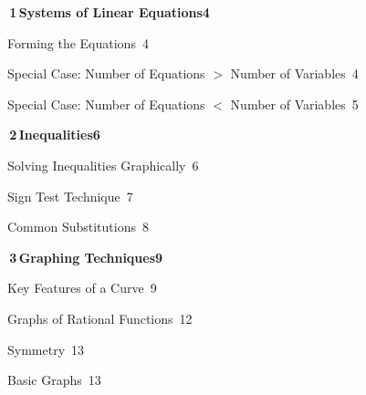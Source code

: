 \documentclass[a4paper,openany]{book}
\begin{document}
{\small\linespread{0.92}\selectfont
\medskip\noindent\colorbox{blue!8}{\parbox{\dimexpr\textwidth-2\fboxsep}{\large\bfseries\color{blue!50!black}\colorbox{blue!50!black}{\color{white}\,1\,}\quad Systems of Linear Equations\hfill 4}}\par\nopagebreak\smallskip\nopagebreak
\noindent{}\quad Forming the Equations\dotfill\ 4\par
\noindent{}\quad Special Case: Number of Equations $>$ Number of Variables\dotfill\ 4\par
\noindent{}\quad Special Case: Number of Equations $<$ Number of Variables\dotfill\ 5\par
\medskip\noindent\colorbox{blue!8}{\parbox{\dimexpr\textwidth-2\fboxsep}{\large\bfseries\color{blue!50!black}\colorbox{blue!50!black}{\color{white}\,2\,}\quad Inequalities\hfill 6}}\par\nopagebreak\smallskip\nopagebreak
\noindent{}\quad Solving Inequalities Graphically\dotfill\ 6\par
\noindent{}\quad Sign Test Technique\dotfill\ 7\par
\noindent{}\quad Common Substitutions\dotfill\ 8\par
\medskip\noindent\colorbox{blue!8}{\parbox{\dimexpr\textwidth-2\fboxsep}{\large\bfseries\color{blue!50!black}\colorbox{blue!50!black}{\color{white}\,3\,}\quad Graphing Techniques\hfill 9}}\par\nopagebreak\smallskip\nopagebreak
\noindent{}\quad Key Features of a Curve\dotfill\ 9\par
\noindent{}\quad Graphs of Rational Functions\dotfill\ 12\par
\noindent{}\quad Symmetry\dotfill\ 13\par
\noindent{}\quad Basic Graphs\dotfill\ 13\par
}
\end{document}
